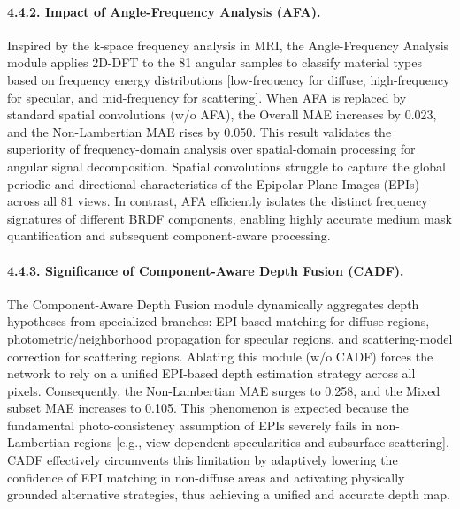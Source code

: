 \documentclass[lettersize,journal]{IEEEtran}
\begin{document}
\paragraph{4.4.2. Impact of Angle-Frequency Analysis (AFA).}
Inspired by the k-space frequency analysis in MRI, the Angle-Frequency Analysis module applies 2D-DFT to the 81 angular samples to classify material types based on frequency energy distributions  [low-frequency for diffuse, high-frequency for specular, and mid-frequency for scattering]. When AFA is replaced by standard spatial convolutions (w/o AFA), the Overall MAE increases by 0.023, and the Non-Lambertian MAE rises by 0.050. This result validates the superiority of frequency-domain analysis over spatial-domain processing for angular signal decomposition. Spatial convolutions struggle to capture the global periodic and directional characteristics of the Epipolar Plane Images (EPIs) across all 81 views. In contrast, AFA efficiently isolates the distinct frequency signatures of different BRDF components, enabling highly accurate medium mask quantification and subsequent component-aware processing.

\paragraph{4.4.3. Significance of Component-Aware Depth Fusion (CADF).}
The Component-Aware Depth Fusion module dynamically aggregates depth hypotheses from specialized branches: EPI-based matching for diffuse regions, photometric/neighborhood propagation for specular regions, and scattering-model correction for scattering regions. Ablating this module (w/o CADF) forces the network to rely on a unified EPI-based depth estimation strategy across all pixels. Consequently, the Non-Lambertian MAE surges to 0.258, and the Mixed subset MAE increases to 0.105. This phenomenon is expected because the fundamental photo-consistency assumption of EPIs severely fails in non-Lambertian regions  [e.g., view-dependent specularities and subsurface scattering]. CADF effectively circumvents this limitation by adaptively lowering the confidence of EPI matching in non-diffuse areas and activating physically grounded alternative strategies, thus achieving a unified and accurate depth map.
\end{document}
